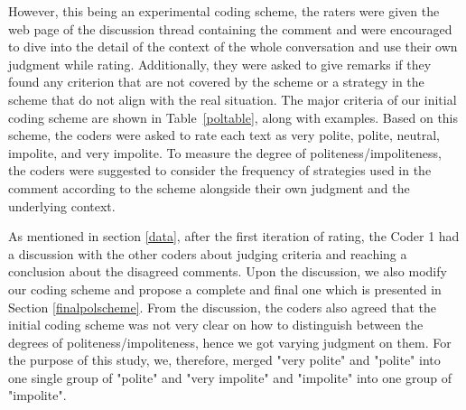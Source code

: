However, this being an experimental coding scheme, 
the raters were given the web page 
of the discussion thread containing the comment 
and were encouraged to dive 
into the detail of the context of the whole conversation 
and use their own judgment while rating. 
Additionally, they were asked to give remarks 
if they found any criterion 
that are not covered by the scheme 
or a strategy in the scheme that
do not align with the real situation. 
The major criteria of our initial coding scheme 
are shown in Table~\ref{poltable}, along with examples.
Based on this scheme, 
the coders were asked to rate each text as 
very polite, polite, neutral, impolite, and very impolite.
To measure the degree of politeness/impoliteness, 
the coders were suggested to consider 
the frequency of strategies used in the comment 
according to the scheme 
alongside their own judgment and the underlying context.

As mentioned in section \ref{data}, 
after the first iteration of rating, 
the Coder 1 had a discussion with the other coders 
about judging criteria 
and reaching a conclusion about the disagreed comments. 
Upon the discussion, 
we also modify our coding scheme and 
propose a complete and final one 
which is presented in Section \ref{finalpolscheme}. 
From the discussion, 
the coders also agreed that the initial coding scheme 
was not very clear on how to distinguish 
between the degrees of politeness/impoliteness, 
hence we got varying judgment on them. 
For the purpose of this study, 
we, therefore, merged 
"very polite" and "polite" into one single group of "polite" 
and "very impolite" and "impolite" into one group of "impolite".

